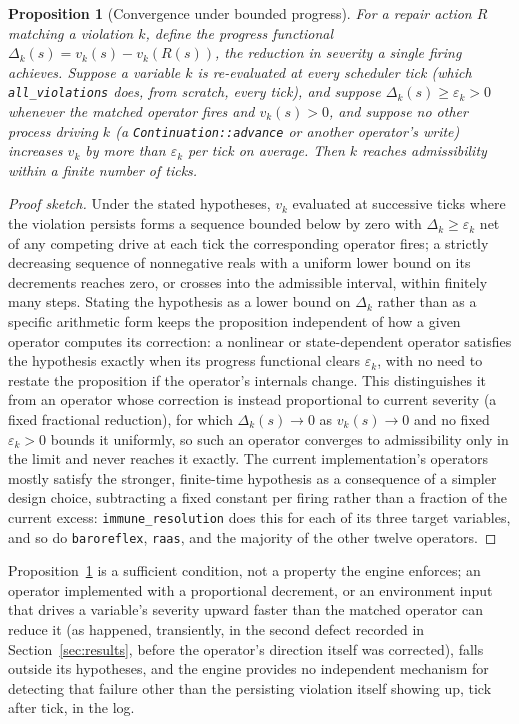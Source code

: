 \documentclass[11pt]{article}
\newtheorem{proposition}{Proposition}
\begin{document}
\begin{proposition}[Convergence under bounded progress]
\label{prop:convergence}
For a repair action $R$ matching a violation $k$, define the progress functional $\Delta_k(s) = v_k(s) - v_k(R(s))$, the reduction in severity a single firing achieves. Suppose a variable $k$ is re-evaluated at every scheduler tick (which \texttt{all\_violations} does, from scratch, every tick), and suppose $\Delta_k(s) \geq \varepsilon_k > 0$ whenever the matched operator fires and $v_k(s) > 0$, and suppose no other process driving $k$ (a \texttt{Continuation::advance} or another operator's write) increases $v_k$ by more than $\varepsilon_k$ per tick on average. Then $k$ reaches admissibility within a finite number of ticks.
\end{proposition}
\begin{proof}[Proof sketch]
Under the stated hypotheses, $v_k$ evaluated at successive ticks where the violation persists forms a sequence bounded below by zero with $\Delta_k \geq \varepsilon_k$ net of any competing drive at each tick the corresponding operator fires; a strictly decreasing sequence of nonnegative reals with a uniform lower bound on its decrements reaches zero, or crosses into the admissible interval, within finitely many steps. Stating the hypothesis as a lower bound on $\Delta_k$ rather than as a specific arithmetic form keeps the proposition independent of how a given operator computes its correction: a nonlinear or state-dependent operator satisfies the hypothesis exactly when its progress functional clears $\varepsilon_k$, with no need to restate the proposition if the operator's internals change. This distinguishes it from an operator whose correction is instead proportional to current severity (a fixed fractional reduction), for which $\Delta_k(s) \to 0$ as $v_k(s) \to 0$ and no fixed $\varepsilon_k > 0$ bounds it uniformly, so such an operator converges to admissibility only in the limit and never reaches it exactly. The current implementation's operators mostly satisfy the stronger, finite-time hypothesis as a consequence of a simpler design choice, subtracting a fixed constant per firing rather than a fraction of the current excess: \texttt{immune\_resolution} does this for each of its three target variables, and so do \texttt{baroreflex}, \texttt{raas}, and the majority of the other twelve operators.
\end{proof}
Proposition~\ref{prop:convergence} is a sufficient condition, not a property the engine enforces; an operator implemented with a proportional decrement, or an environment input that drives a variable's severity upward faster than the matched operator can reduce it (as happened, transiently, in the second defect recorded in Section~\ref{sec:results}, before the operator's direction itself was corrected), falls outside its hypotheses, and the engine provides no independent mechanism for detecting that failure other than the persisting violation itself showing up, tick after tick, in the log.
\end{document}
